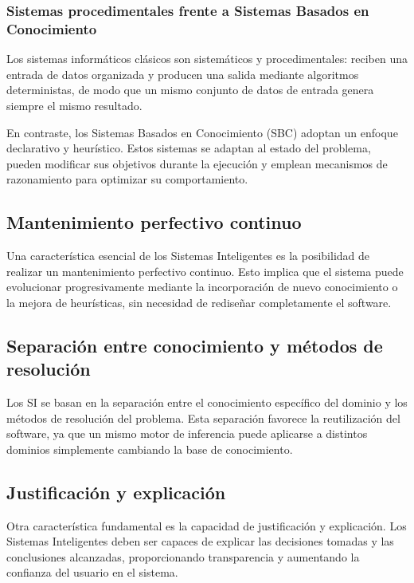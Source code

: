 \documentclass{article}
\begin{document}
    \subsubsection{Sistemas procedimentales frente a Sistemas Basados en Conocimiento}
        
    Los sistemas informáticos clásicos son sistemáticos y procedimentales: reciben una entrada de datos organizada y producen una salida mediante algoritmos deterministas, de modo que un mismo conjunto de datos de entrada genera siempre el mismo resultado.
        
    En contraste, los Sistemas Basados en Conocimiento (SBC) adoptan un enfoque declarativo y heurístico. Estos sistemas se adaptan al estado del problema, pueden modificar sus objetivos durante la ejecución y emplean mecanismos de razonamiento para optimizar su comportamiento.
        
    \subsection{Mantenimiento perfectivo continuo}
        
    Una característica esencial de los Sistemas Inteligentes es la posibilidad de realizar un mantenimiento perfectivo continuo. Esto implica que el sistema puede evolucionar progresivamente mediante la incorporación de nuevo conocimiento o la mejora de heurísticas, sin necesidad de rediseñar completamente el software.
        
    \subsection{Separación entre conocimiento y métodos de resolución}
        
    Los SI se basan en la separación entre el conocimiento específico del dominio y los métodos de resolución del problema. Esta separación favorece la reutilización del software, ya que un mismo motor de inferencia puede aplicarse a distintos dominios simplemente cambiando la base de conocimiento.
        
    \subsection{Justificación y explicación}
        
    Otra característica fundamental es la capacidad de justificación y explicación. Los Sistemas Inteligentes deben ser capaces de explicar las decisiones tomadas y las conclusiones alcanzadas, proporcionando transparencia y aumentando la confianza del usuario en el sistema.
        
\end{document}
